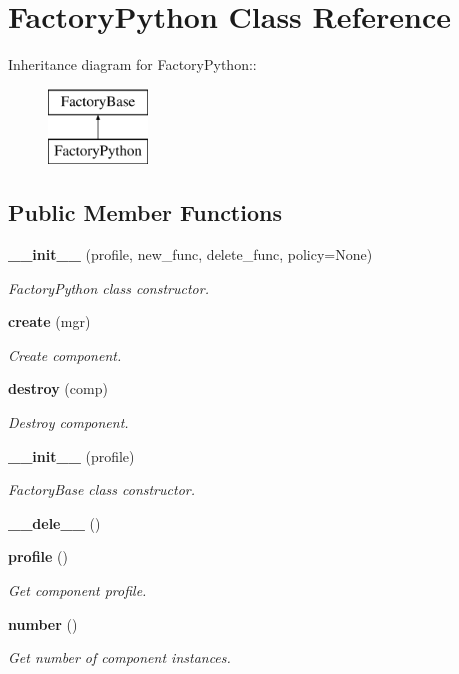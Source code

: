 \section{Factory\-Python Class Reference}
\label{classFactoryPython}
Inheritance diagram for Factory\-Python::\begin{figure}[H]
\begin{center}
\leavevmode
\includegraphics[height=2cm]{classFactoryPython}
\end{center}
\end{figure}
\subsection*{Public Member Functions}
\begin{CompactItemize}
\item 
{\bf \_\-\_\-init\_\-\_\-} (profile, new\_\-func, delete\_\-func, policy=None)
\begin{CompactList}\small\item\em Factory\-Python class constructor. \item\end{CompactList}\item 
{\bf create} (mgr)
\begin{CompactList}\small\item\em Create component. \item\end{CompactList}\item 
{\bf destroy} (comp)
\begin{CompactList}\small\item\em Destroy component. \item\end{CompactList}\item 
{\bf \_\-\_\-init\_\-\_\-} (profile)
\begin{CompactList}\small\item\em Factory\-Base class constructor. \item\end{CompactList}\item 
{\bf \_\-\_\-dele\_\-\_\-} ()
\item 
{\bf profile} ()
\begin{CompactList}\small\item\em Get component profile. \item\end{CompactList}\item 
{\bf number} ()
\begin{CompactList}\small\item\em Get number of component instances. \item\end{CompactList}\end{CompactItemize}


